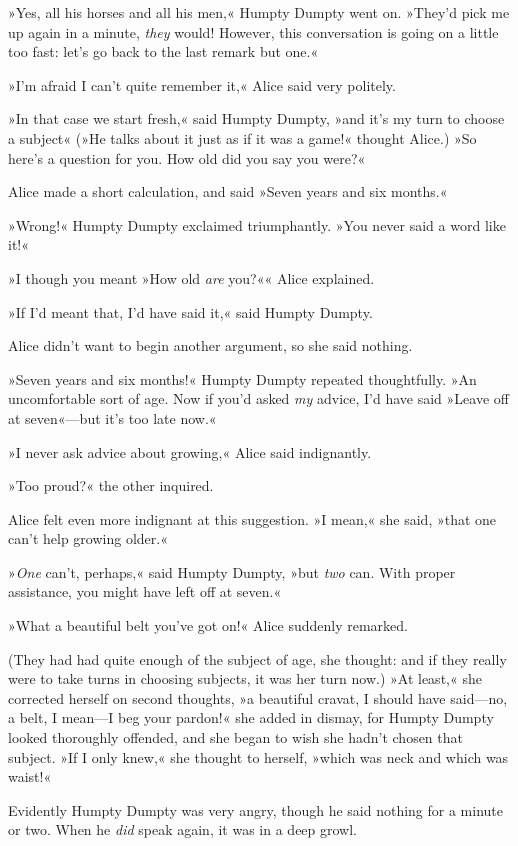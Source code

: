»Yes, all his horses and all his men,« Humpty Dumpty went on. »They'd pick me up again in a minute, \textit{they} would! However, this conversation is going on a little too fast: let's go back to the last remark but one.«

»I'm afraid I can't quite remember it,« Alice said very politely.

»In that case we start fresh,« said Humpty Dumpty, »and it's my turn to choose a subject\longdash« (»He talks about it just as if it was a game!« thought Alice.) »So here's a question for you. How old did you say you were?«

Alice made a short calculation, and said »Seven years and six months.«

»Wrong!« Humpty Dumpty exclaimed triumphantly. »You never said a word like it!«

»I though you meant »How old \textit{are} you?«« Alice explained.

»If I'd meant that, I'd have said it,« said Humpty Dumpty.

Alice didn't want to begin another argument, so she said nothing.

»Seven years and six months!« Humpty Dumpty repeated thoughtfully. »An uncomfortable sort of age. Now if you'd asked \textit{my} advice, I'd have said »Leave off at seven«—but it's too late now.«

»I never ask advice about growing,« Alice said indignantly.

»Too proud?« the other inquired.

Alice felt even more indignant at this suggestion. »I mean,« she said, »that one can't help growing older.«

»\textit{One} can't, perhaps,« said Humpty Dumpty, »but \textit{two} can. With proper assistance, you might have left off at seven.«

»What a beautiful belt you've got on!« Alice suddenly remarked.

(They had had quite enough of the subject of age, she thought: and if they really were to take turns in choosing subjects, it was her turn now.) »At least,« she corrected herself on second thoughts, »a beautiful cravat, I should have said—no, a belt, I mean—I beg your pardon!« she added in dismay, for Humpty Dumpty looked thoroughly offended, and she began to wish she hadn't chosen that subject. »If I only knew,« she thought to herself, »which was neck and which was waist!«

Evidently Humpty Dumpty was very angry, though he said nothing for a minute or two. When he \textit{did} speak again, it was in a deep growl.

